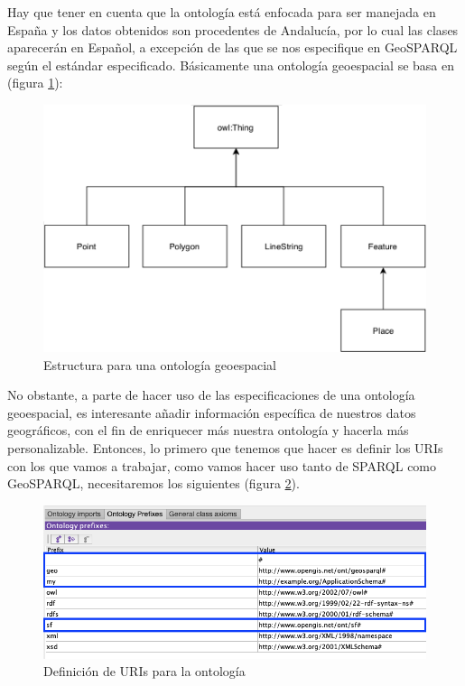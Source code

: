 Hay que tener en cuenta que la ontología está enfocada para ser manejada en España y los datos obtenidos son procedentes de Andalucía, por lo cual las clases aparecerán en Español, a excepción de las que se nos especifique en GeoSPARQL según el estándar especificado. Básicamente una ontología geoespacial se basa en (figura \ref{fig:ontologia-geosparql}):

\begin{figure}[H]
	\centering
	\includegraphics[width=0.65\linewidth]{imagenes/capitulo5/ontologia-geosparql}
	\caption{Estructura para una ontología geoespacial}
	\label{fig:ontologia-geosparql}
\end{figure}

No obstante, a parte de hacer uso de las especificaciones de una ontología geoespacial, es interesante añadir información específica de nuestros datos geográficos, con el fin de enriquecer más nuestra ontología y hacerla más personalizable. Entonces, lo primero que tenemos que hacer es definir los URIs con los que vamos a trabajar, como vamos hacer uso tanto de SPARQL como GeoSPARQL, necesitaremos los siguientes (figura \ref{fig:prefijos}).
 

\begin{figure}[H]
	\centering
	\includegraphics[width=0.75\linewidth]{imagenes/capitulo5/prefijos}
	\caption{Definición de URIs para la ontología}
	\label{fig:prefijos}
\end{figure}

